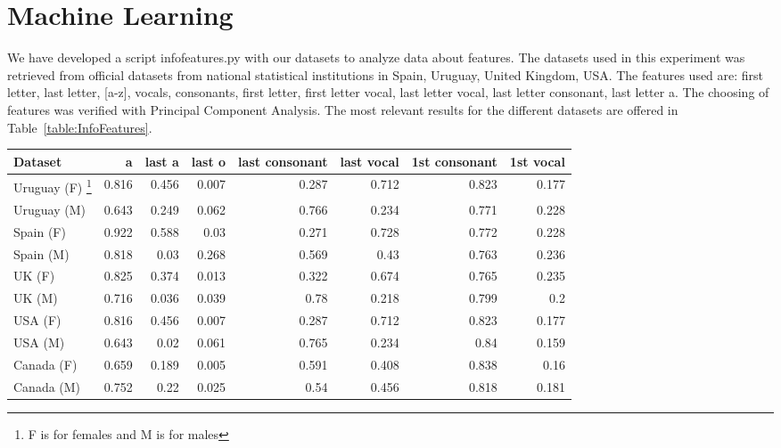 \documentclass[a4paper]{article}
\begin{document}
\section{Machine Learning}

We have developed a script infofeatures.py with our datasets to analyze data about features.
The datasets used in this experiment was retrieved from official datasets from national statistical
institutions in Spain, Uruguay, United Kingdom, USA. The features used are: first letter, last letter, [a-z], vocals, consonants, first letter, first letter vocal, last letter vocal, last letter consonant, last letter a. 
The choosing of features was verified with Principal Component Analysis.
The most relevant results for the different datasets are offered in Table~\ref{table:InfoFeatures}.

\begin{table*}
\footnotesize
\begin{tabular}[]{lrrrrrrr}
  \hline
Dataset & a & last a & last o & last consonant & last vocal & 1st consonant & 1st vocal  \tabularnewline
  \hline
 Uruguay (F) \footnote{F is for females and M is for males} &    0.816 &         0.456 &         0.007 &                 0.287 &             0.712 &                  0.823 &              0.177  \tabularnewline
 Uruguay (M) \footnotemark[3] &    0.643 &         0.249 &         0.062 &                 0.766 &             0.234 &                  0.771 &              0.228  \tabularnewline
 Spain (F) \footnotemark[3]  &    0.922 &         0.588 &          0.03 &                 0.271 &             0.728 &                  0.772 &              0.228  \tabularnewline
 Spain (M) \footnotemark[3]  &    0.818 &          0.03 &         0.268 &                 0.569 &              0.43 &                  0.763 &              0.236  \tabularnewline
 UK (F) \footnotemark[3]     &    0.825 &         0.374 &         0.013 &                 0.322 &             0.674 &                  0.765 &              0.235  \tabularnewline
 UK (M) \footnotemark[3]     &    0.716 &         0.036 &         0.039 &                  0.78 &             0.218 &                  0.799 &                0.2  \tabularnewline
 USA (F) \footnotemark[3]    &    0.816 &         0.456 &         0.007 &                 0.287 &             0.712 &                  0.823 &              0.177  \tabularnewline
 USA (M) \footnotemark[3]    &    0.643 &          0.02 &         0.061 &                 0.765 &             0.234 &                   0.84 &              0.159  \tabularnewline
 Canada (F) \footnotemark[3] &    0.659 &         0.189 &         0.005 &                 0.591 &             0.408 &                  0.838 &              0.16  \tabularnewline
 Canada (M) \footnotemark[3] &    0.752 &          0.22 &         0.025 &                  0.54 &             0.456 &                  0.818 &              0.181  \tabularnewline

\hline
\end{tabular}
\caption{Informative Features in Different Countries}
\label{table:InfoFeatures}
\end{table*}
\end{document}
